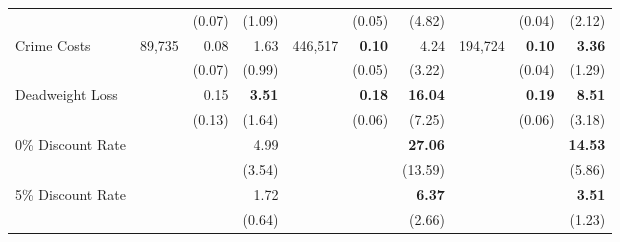 \begin{tabular}{l r r r r r r r r r}
	&	&	(0.07)	&	(1.09)	&	&	(0.05)	&	(4.82)	&	&	(0.04)	&	(2.12)	\\
Crime Costs	&	89,735	&	0.08	&	1.63	&	446,517	&	\textbf{0.10}	&	4.24	&	194,724	&	\textbf{0.10}	&	\textbf{3.36}	\\
	&		&	(0.07)	&	(0.99)	&	&	(0.05)	&	(3.22)	&	&	(0.04)	&	(1.29)	\\[0.9em]
Deadweight Loss	&		&	0.15	&	\textbf{3.51}	&		&	\textbf{0.18}	&	\textbf{16.04}	&		&	\textbf{0.19}	&	\textbf{8.51}	\\
	&		&	(0.13)	&	(1.64)	&		&	(0.06)	&	(7.25)	&		&	(0.06)	&	(3.18)	\\
0\% Discount Rate	&		&		&	4.99	&		&		&	\textbf{27.06}	&		&		&	\textbf{14.53}	\\
	&		&		&	(3.54)	&		&		&	(13.59)	&		&		&	(5.86)	\\
5\% Discount Rate	&		&		&	1.72	&		&		&	\textbf{6.37}	&		&		&	\textbf{3.51}	\\
	&		&		&	(0.64)	&		&		&	(2.66)	&		&		&	(1.23)	\\
\bottomrule																			
\end{tabular}																			
